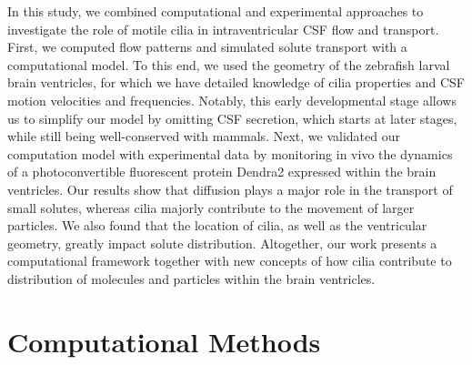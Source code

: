 \documentclass{WileyMSP-template}
\begin{document}
In this study, we combined computational and experimental approaches to investigate
the role of motile cilia in intraventricular CSF flow and transport.
First, we computed flow patterns and simulated solute transport with a computational model. To
this end, we used the geometry of the zebrafish larval brain ventricles,
for which we have detailed knowledge of cilia properties and CSF motion velocities
and frequencies. Notably, this early developmental stage allows us to simplify our model
by omitting CSF secretion, which starts at later stages,
while still being well-conserved with mammals. 
Next, we validated our computation model with experimental data by monitoring in vivo
the dynamics of a photoconvertible fluorescent protein Dendra2
expressed within the brain ventricles.
Our results show that diffusion plays a major role in the transport of small solutes,
whereas cilia majorly contribute to the movement of larger particles.
We also found that the location of cilia, as well as the ventricular geometry, greatly
impact solute distribution. Altogether, our work presents a computational
framework together with new concepts of how cilia contribute to distribution of molecules and
particles within the brain ventricles. 

\section{Computational Methods}
\end{document}
